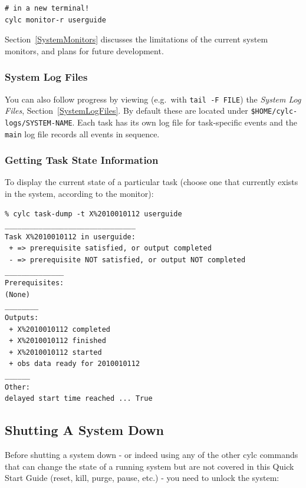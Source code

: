 \documentclass[11pt,a4paper]{article}
\begin{document}
\begin{lstlisting}
# in a new terminal!
cylc monitor-r userguide
\end{lstlisting}

Section~\ref{SystemMonitors} discusses the limitations of the
current system monitors, and plans for future development.

\subsubsection{System Log Files}
\label{QuickSystemLogFiles}

You can also follow progress by viewing (e.g.\ with 
\lstinline=tail -F FILE=) the {\em System Log Files},
Section~\ref{SystemLogFiles}. By
default these are located under \lstinline=$HOME/cylc-logs/SYSTEM-NAME=.
Each task has its own log file for task-specific events and the
\lstinline=main= log file records all events in sequence.


\pagebreak
\lstset{language=}
\subsubsection{Getting Task State Information}
\label{QuickGettingTaskStateInformation}

To display the current state of a particular task (choose one that
currently exists in the system, according to the monitor):

\begin{lstlisting}
% cylc task-dump -t X%2010010112 userguide
_______________________________
Task X%2010010112 in userguide:
 + => prerequisite satisfied, or output completed
 - => prerequisite NOT satisfied, or output NOT completed
______________
Prerequisites:
(None)
________
Outputs:
 + X%2010010112 completed
 + X%2010010112 finished
 + X%2010010112 started
 + obs data ready for 2010010112
______
Other:
delayed start time reached ... True
\end{lstlisting}

\lstset{language=bash}
\subsection{Shutting A System Down}
\label{QuickShuttingASystemDown}

\lstset{language=bash}

Before shutting a system down - or indeed using any of the other cylc
commands that can change the state of a running system but are not 
covered in this Quick Start Guide (reset, kill, purge, pause, etc.) -
you need to unlock the system:
\end{document}
